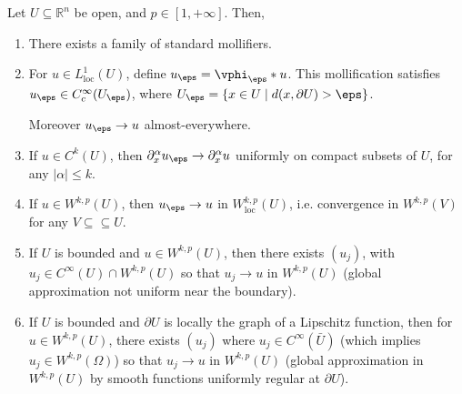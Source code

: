 \documentclass[12pt]{article}
\begin{document}
\begin{proposition}
	Let $U \subseteq \mathbb{R}^n$ be open, and $p \in [1, +\infty]$. Then,
	\begin{enumerate}[\normalfont(i)]
		\item There exists a family of standard mollifiers.
		\item For $u \in L^1_{\mathrm{loc}}(U)$, define $u_\eps = \vphi_\eps \ast u$. This mollification satisfies $u_\eps \in C_c^{\infty}(U_\eps)$, where $U_\eps = \{x \in U \mid d(x, \partial U) > \eps\}$.

			Moreover $u_\eps \to u$ almost-everywhere.
		\item If $u \in C^k(U)$, then $\partial^{\alpha}_x u_\eps \to \partial^{\alpha}_x u$ uniformly on compact subsets of $U$, for any $|\alpha| \leq k$.
		\item If $u \in W^{k, p}(U)$, then $u_\eps \to u$ in $W^{k, p}_{\mathrm{loc}}(U)$, i.e. convergence in $W^{k,p}(V)$ for any $V \subseteq \subseteq U$.
		\item If $U$ is bounded and $u \in W^{k, p}(U)$, then there exists $(u_j)$, with $u_j \in C^{\infty}(U) \cap W^{k, p}(U)$ so that $u_j \to u$ in $W^{k, p}(U)$ (global approximation not uniform near the boundary).
		\item If $U$ is bounded and $\partial U$ is locally the graph of a Lipschitz function, then for $u \in W^{k, p}(U)$, there exists $(u_j)$ where $u_j \in C^{\infty}(\bar U)$ (which implies $u_j \in W^{k, p}(\Omega)$) so that $u_j \to u$ in $W^{k, p}(U)$ (global approximation in $W^{k,p}(U)$ by smooth functions uniformly regular at $\partial U$).
	\end{enumerate}
\end{proposition}
\end{document}
